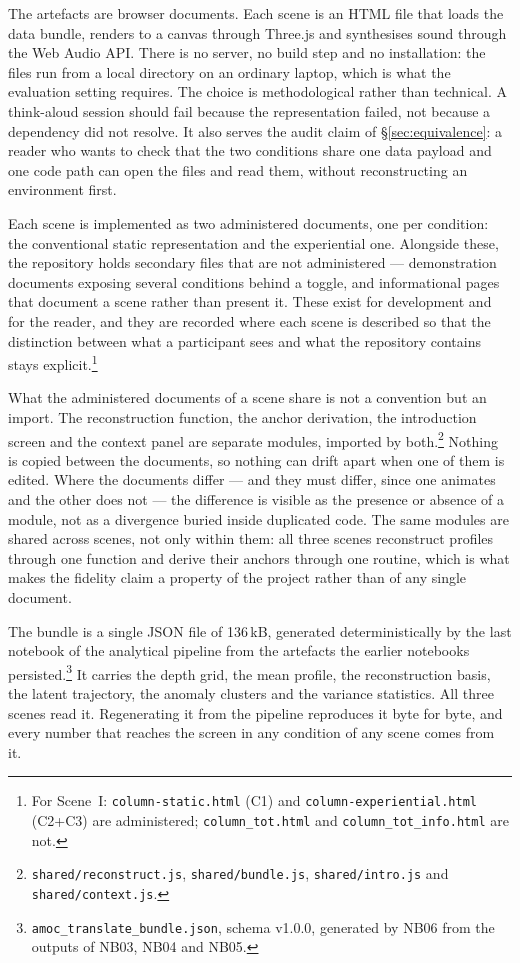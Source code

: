 The artefacts are browser documents. Each scene is an HTML file that loads the data bundle, renders to a canvas through Three.js and synthesises sound through the Web Audio API. There is no server, no build step and no installation: the files run from a local directory on an ordinary laptop, which is what the evaluation setting requires. The choice is methodological rather than technical. A think-aloud session should fail because the representation failed, not because a dependency did not resolve. It also serves the audit claim of \S\ref{sec:equivalence}: a reader who wants to check that the two conditions share one data payload and one code path can open the files and read them, without reconstructing an environment first.

Each scene is implemented as two administered documents, one per condition: the conventional static representation and the experiential one. Alongside these, the repository holds secondary files that are not administered --- demonstration documents exposing several conditions behind a toggle, and informational pages that document a scene rather than present it. These exist for development and for the reader, and they are recorded where each scene is described so that the distinction between what a participant sees and what the repository contains stays explicit.\footnote{For Scene~I: \texttt{column-static.html} (C1) and \texttt{column-experiential.html} (C2+C3) are administered; \texttt{column\_tot.html} and \texttt{column\_tot\_info.html} are not.}

What the administered documents of a scene share is not a convention but an import. The reconstruction function, the anchor derivation, the introduction screen and the context panel are separate modules, imported by both.\footnote{\texttt{shared/reconstruct.js}, \texttt{shared/bundle.js}, \texttt{shared/intro.js} and \texttt{shared/context.js}.} Nothing is copied between the documents, so nothing can drift apart when one of them is edited. Where the documents differ --- and they must differ, since one animates and the other does not --- the difference is visible as the presence or absence of a module, not as a divergence buried inside duplicated code. The same modules are shared across scenes, not only within them: all three scenes reconstruct profiles through one function and derive their anchors through one routine, which is what makes the fidelity claim a property of the project rather than of any single document.

The bundle is a single JSON file of 136\,kB, generated deterministically by the last notebook of the analytical pipeline from the artefacts the earlier notebooks persisted.\footnote{\texttt{amoc\_translate\_bundle.json}, schema v1.0.0, generated by NB06 from the outputs of NB03, NB04 and NB05.} It carries the depth grid, the mean profile, the reconstruction basis, the latent trajectory, the anomaly clusters and the variance statistics. All three scenes read it. Regenerating it from the pipeline reproduces it byte for byte, and every number that reaches the screen in any condition of any scene comes from it.

